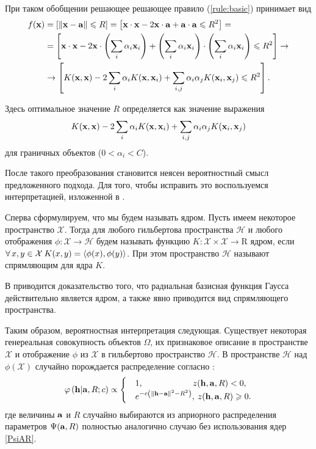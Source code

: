 При таком обобщении решающее решающее правило (\ref{rule:basic}) принимает вид 
\begin{align}
	\label{rule:kernel}
	f(\boldsymbol{\mathbf{x}}) 
		&= 	\left[\left\|{\boldsymbol{\mathbf{x}}-\boldsymbol{\mathbf{a}}}\right\| \leqslant R\right] 
		= 	\left[\boldsymbol{\mathbf{x}}\cdot\boldsymbol{\mathbf{x}} - 2\boldsymbol{\mathbf{x}}\cdot\boldsymbol{\mathbf{a}} + \boldsymbol{\mathbf{a}}\cdot\boldsymbol{\mathbf{a}} \leqslant R^2\right] = \notag \\
		&= 	\left[\boldsymbol{\mathbf{x}}\cdot\boldsymbol{\mathbf{x}} - 2\boldsymbol{\mathbf{x}}\cdot\left(\sum\limits_{i} \alpha_i \boldsymbol{\mathbf{x}}_i\right) + \left(\sum\limits_{i} \alpha_i \boldsymbol{\mathbf{x}}_i\right)\cdot\left(\sum\limits_{i} \alpha_i \boldsymbol{\mathbf{x}}_i\right) \leqslant R^2\right] \to \notag \\
		&\to \left[K(\boldsymbol{\mathbf{x}},\boldsymbol{\mathbf{x}}) - 2\sum\limits_{i} \alpha_i K(\boldsymbol{\mathbf{x}}, \boldsymbol{\mathbf{x}}_i) + \sum\limits_{i,j} \alpha_i\alpha_jK(\boldsymbol{\mathbf{x}}_i,\boldsymbol{\mathbf{x}}_j) \leqslant R^2\right].
\end{align}

Здесь оптимальное значение $R$ определяется как значение выражения $$K(\boldsymbol{\mathbf{x}},\boldsymbol{\mathbf{x}}) - 2\sum\limits_{i} \alpha_i K(\boldsymbol{\mathbf{x}}, \boldsymbol{\mathbf{x}}_i) + \sum\limits_{i,j} \alpha_i\alpha_jK(\boldsymbol{\mathbf{x}}_i,\boldsymbol{\mathbf{x}}_j)$$ для граничных объектов ($0<\alpha_i<C$).

После такого преобразования становится неясен вероятностный смысл предложенного подхода. Для того, чтобы исправить это воспользуемся интерпретацией, изложенной в \cite{Markov}. 

Сперва сформулируем, что мы будем называть ядром. Пусть имеем некоторое пространство $\mathcal X$. Тогда для любого гильбертова пространства $\mathcal H$ и любого отображения $\phi \colon \mathcal X \to \mathcal H$ будем называть функцию $K\colon \mathcal X\times\mathcal X\to \mathrm R$ ядром, если $\forall\,x,y\in \mathcal X\: K(x,y) =\left\langle\phi(x),\phi(y)\right\rangle$. При этом пространство $\mathcal H$ называют спрямляющим для ядра $K$.

В \cite{Steinwart} приводится доказательство того, что радиальная базисная функция Гаусса действительно является ядром, а также явно приводится вид спрямляющего пространства.

Таким образом, вероятностная интерпретация следующая. Существует некоторая генереальная совокупность объектов $\Omega$, их признаковое описание в пространстве $\mathcal X$ и отображение $\phi$ из $\mathcal X$ в гильбертово пространство $\mathcal H$. В пространстве $\mathcal H$ над $\phi(\mathcal X)$ случайно порождается распределение согласно \label{PhiXARC}:
\begin{equation}
	\label{PhiHARC}
	\varphi \left( {\boldsymbol{\mathbf{h}} | \boldsymbol{\mathbf{a}},R;c} \right) \propto
		\begin{cases}
			&1, 				\qquad\qquad\qquad  	\! 	z(\boldsymbol{\mathbf{h}},\boldsymbol{\mathbf{a}},R) < 0, \\
			&e^{-c \left(\left\|{\boldsymbol{\mathbf{h}}-\boldsymbol{\mathbf{a}}}\right\|^2-R^2\right)}, 	\:	z(\boldsymbol{\mathbf{h}},\boldsymbol{\mathbf{a}},R) \geqslant 0.
		\end{cases}
\end{equation}
где величины $\boldsymbol{\mathbf{a}}$ и $R$ случайно выбираются из априорного распределения параметров $\Psi(\boldsymbol{\mathbf{a}},R)$ полностью аналогично случаю без использования ядер \ref{PsiAR}.
